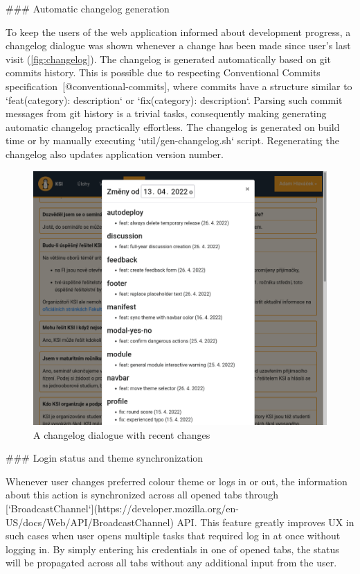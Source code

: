 \documentclass[
  digital, %
  oneside, %
  lof,     %
  lot,     %
]{fithesis4}
\begin{document}
{### Automatic changelog generation
\label{chap:changelog}

To keep the users of the web application informed about development progress, a changelog dialogue was shown whenever a change has been made since user's last visit (\autoref{fig:changelog}). The changelog is generated automatically based on git commits history. This is possible due to respecting Conventional Commits specification~[@conventional-commits], where commits have a structure similar to `feat(category): description` or `fix(category): description`. Parsing such commit messages from git history is a trivial tasks, consequently making generating automatic changelog practically effortless. The changelog is generated on build time or by manually executing `util/gen-changelog.sh` script. Regenerating the changelog also updates application version number.

\begin{figure}
\includegraphics[width=\textwidth]{assets/img/changelog}
\caption{A changelog dialogue with recent changes}
\label{fig:changelog}
\end{figure}

### Login status and theme synchronization

Whenever user changes preferred colour theme or logs in or out, the information about this action is synchronized across all opened tabs through [`BroadcastChannel`](https://developer.mozilla.org/en-US/docs/Web/API/BroadcastChannel) API. This feature greatly improves UX in such cases when user opens multiple tasks that required log in at once without logging in. By simply entering his credentials in one of opened tabs, the status will be propagated across all tabs without any additional input from the user.

}
\end{document}

